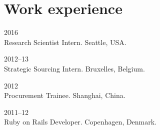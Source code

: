 \section*{Work experience}

\begin{paracol}{2}
  \textsc{2016}
\switchcolumn
  \\
  Research Scientist Intern. Seattle, USA.
\end{paracol}

\begin{paracol}{2}
  \textsc{2012--13}
\switchcolumn
  \\
  Strategic Sourcing Intern. Bruxelles, Belgium.
\end{paracol}

\begin{paracol}{2}
  \textsc{2012}
\switchcolumn
  \\
  Procurement Trainee. Shanghai, China.
\end{paracol}

\begin{paracol}{2}
  \textsc{2011--12}
\switchcolumn
  \\
  Ruby on Rails Developer. Copenhagen, Denmark.
\end{paracol}